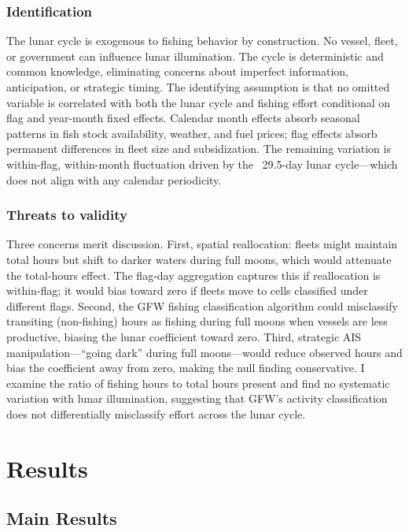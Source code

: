 \documentclass[12pt]{article}
\begin{document}
\subsubsection*{Identification} The lunar cycle is exogenous to fishing behavior by construction. No vessel, fleet, or government can influence lunar illumination. The cycle is deterministic and common knowledge, eliminating concerns about imperfect information, anticipation, or strategic timing. The identifying assumption is that no omitted variable is correlated with both the lunar cycle and fishing effort conditional on flag and year-month fixed effects. Calendar month effects absorb seasonal patterns in fish stock availability, weather, and fuel prices; flag effects absorb permanent differences in fleet size and subsidization. The remaining variation is within-flag, within-month fluctuation driven by the ~29.5-day lunar cycle---which does not align with any calendar periodicity.

\subsubsection*{Threats to validity} Three concerns merit discussion. First, spatial reallocation: fleets might maintain total hours but shift to darker waters during full moons, which would attenuate the total-hours effect. The flag-day aggregation captures this if reallocation is within-flag; it would bias toward zero if fleets move to cells classified under different flags. Second, the GFW fishing classification algorithm could misclassify transiting (non-fishing) hours as fishing during full moons when vessels are less productive, biasing the lunar coefficient toward zero. Third, strategic AIS manipulation---``going dark'' during full moons---would reduce observed hours and bias the coefficient away from zero, making the null finding conservative. I examine the ratio of fishing hours to total hours present and find no systematic variation with lunar illumination, suggesting that GFW's activity classification does not differentially misclassify effort across the lunar cycle.


\section{Results}
\label{sec:results}

\subsection{Main Results}
\end{document}
